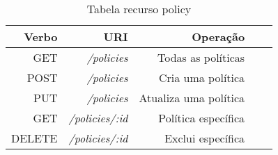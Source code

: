 \begin{table}[!htb]
    \centering
    \caption[Recurso Política]{Tabela recurso policy
    \label{tab:tabela-optimization}}
    \begin{tabular}{rrrrr}
        \toprule
            Verbo & URI & Operação \\ 
        \midrule
            GET & \textit{/policies} & Todas as políticas \\
            POST & \textit{/policies} &  Cria uma política \\
            PUT & \textit{/policies} &  Atualiza uma política \\
            GET & \textit{/policies/:id} & Política específica \\
            DELETE & \textit{/policies/:id} & Exclui específica \\
        \bottomrule
    \end{tabular}
\end{table}

